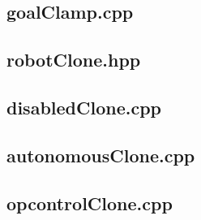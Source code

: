 \subsection{goalClamp.cpp}

\subsection{robotClone.hpp}

\subsection{disabledClone.cpp}

\subsection{autonomousClone.cpp}

\subsection{opcontrolClone.cpp}

